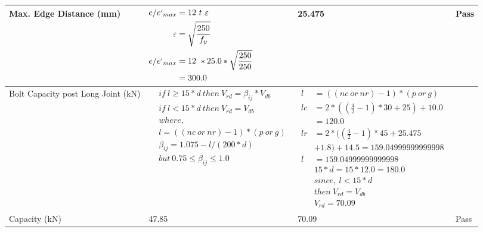 \documentclass{article}%
\begin{document}
\begin{longtable}{|p{4cm}|p{5cm}|p{5.5cm}|p{1.5cm}|}
\hline%
Max. Edge Distance (mm)&$\begin{aligned}e/e`_{max} &= 12~ t~ \varepsilon&\\ \varepsilon &= \sqrt{\frac{250}{f_y}}\\ e/e`_{max}&=12 ~*25.0*\sqrt{\frac{250}{250}}\\ &=300.0\\ \end{aligned}$&25.475&Pass\\%
\hline%
Bolt Capacity post Long Joint (kN)&$\begin{aligned} &if~l\geq 15 * d~then~V_{rd} = \beta_{ij} * V_{db} \\ & if~l < 15 * d~then~V_{rd} = V_{db} \\ & where,\\ & l = ((nc~or~nr) - 1) * (p~or~g) \\ & \beta_{ij} = 1.075 - l/(200 * d) \\ & but~0.75\leq\beta_{ij}\leq1.0 \end{aligned}$&$\begin{aligned} l~&= ((nc~or~nr) - 1) * (p~or~g) \\  lc&= 2*((\frac{4}{2} - 1) * 30+25)+ 10.0\\&=120.0\\  lr&= 2*((\frac{4}{2} - 1) * 45+25.475\\& +1.8)+ 14.5=159.04999999999998\\  l~&= 159.04999999999998\\ & 15 * d = 15 * 12.0 = 180.0 \\ & since,~l < 15 * d~ \\& then~V_{rd} = V_{db} \\ & V_{rd} = 70.09 \end{aligned}$&\\%
\hline%
Capacity (kN)&47.85&70.09&Pass\\%
\hline%
\end{longtable}

%
\newpage%
\end{document}
